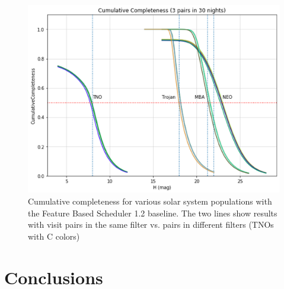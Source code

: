 \begin{figure}[tb!]
\begin{center}
\includegraphics[width=0.60\linewidth]{figs/allcum.png}
\end{center}
\caption{Cumulative completeness for various solar system populations with the Feature Based Scheduler 1.2 baseline.
The two lines show results with visit pairs in the same filter vs. pairs in different filters (TNOs with C colors)}
\label{fig:allcum}       %
\end{figure}

\clearpage
\section{Conclusions} \label{sec:conclusions}


